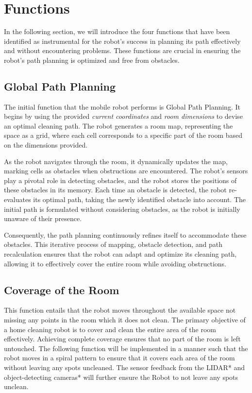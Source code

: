 \documentclass[12pt]{article}
\begin{document}
\section{Functions}
In the following section, we will introduce the four functions that have been identified as instrumental for the robot's success in planning its path effectively and without encountering problems. These functions are crucial in ensuring the robot's path planning is optimized and free from obstacles.

\subsection{Global Path Planning}
The initial function that the mobile robot performs is Global Path Planning. It begins by using the provided \textit{current coordinates} and \textit{room dimensions} to devise an optimal cleaning path. The robot generates a room map, representing the space as a grid, where each cell corresponds to a specific part of the room based on the dimensions provided. 

As the robot navigates through the room, it dynamically updates the map, marking cells as obstacles when obstructions are encountered. The robot's sensors play a pivotal role in detecting obstacles, and the robot stores the positions of these obstacles in its memory. Each time an obstacle is detected, the robot re-evaluates its optimal path, taking the newly identified obstacle into account. The initial path is formulated without considering obstacles, as the robot is initially unaware of their presence. 

Consequently, the path planning continuously refines itself to accommodate these obstacles. This iterative process of mapping, obstacle detection, and path recalculation ensures that the robot can adapt and optimize its cleaning path, allowing it to effectively cover the entire room while avoiding obstructions.

\subsection{Coverage of the Room}
This function entails that the robot moves throughout the available space not missing any points in the room which it does not clean. The primary objective of a home cleaning robot is to cover and clean the entire area of the room effectively. Achieving complete coverage ensures that no part of the room is left untouched. The following function will be implemented in a manner such that the robot moves in a spiral pattern to ensure that it covers each area of the room without leaving any spots uncleaned. The sensor feedback from the LIDAR* and object-detecting cameras* will further ensure the Robot to not leave any spots unclean. 
\end{document}
